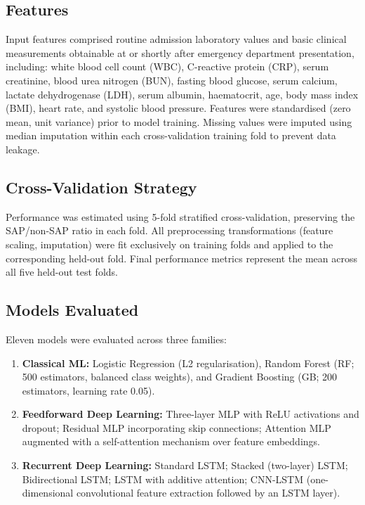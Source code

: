 \documentclass[12pt,a4paper]{article}
\begin{document}
\subsection{Features}

Input features comprised routine admission laboratory values and basic clinical measurements obtainable at or shortly after emergency department presentation, including: white blood cell count (WBC), C-reactive protein (CRP), serum creatinine, blood urea nitrogen (BUN), fasting blood glucose, serum calcium, lactate dehydrogenase (LDH), serum albumin, haematocrit, age, body mass index (BMI), heart rate, and systolic blood pressure. Features were standardised (zero mean, unit variance) prior to model training. Missing values were imputed using median imputation within each cross-validation training fold to prevent data leakage.

\subsection{Cross-Validation Strategy}

Performance was estimated using 5-fold stratified cross-validation, preserving the SAP/non-SAP ratio in each fold. All preprocessing transformations (feature scaling, imputation) were fit exclusively on training folds and applied to the corresponding held-out fold. Final performance metrics represent the mean across all five held-out test folds.

\subsection{Models Evaluated}

Eleven models were evaluated across three families:

\begin{enumerate}
    \item \textbf{Classical ML:} Logistic Regression (L2 regularisation), Random Forest (RF; 500 estimators, balanced class weights), and Gradient Boosting (GB; 200 estimators, learning rate 0.05).
    \item \textbf{Feedforward Deep Learning:} Three-layer MLP with ReLU activations and dropout; Residual MLP incorporating skip connections; Attention MLP augmented with a self-attention mechanism over feature embeddings.
    \item \textbf{Recurrent Deep Learning:} Standard LSTM; Stacked (two-layer) LSTM; Bidirectional LSTM; LSTM with additive attention; CNN-LSTM (one-dimensional convolutional feature extraction followed by an LSTM layer).
\end{enumerate}
\end{document}

